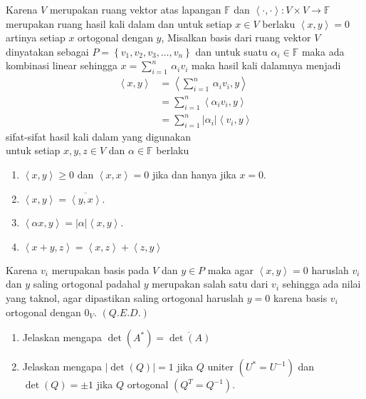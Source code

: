 \documentclass[11pt,a4paper]{article}
\newcommand{\ds}{\displaystyle}
\theoremstyle{plain}
\theoremstyle{definition}
\theoremstyle{remark}
\begin{document}
\begin{enumerate}
\begin{enumerate}
		Karena $V$ merupakan ruang vektor atas lapangan $\mathbb{F}$ dan $\left\langle \cdot,\cdot\right\rangle:V\times V\rightarrow \mathbb{F}$ merupakan ruang hasil kali dalam dan untuk setiap $x\in V$ berlaku $\left\langle x,y\right\rangle=0$ artinya setiap $x$ ortogonal dengan $y$, Misalkan basis dari ruang vektor $V$ dinyatakan sebagai $P=\left\{ v_{1},v_{2},v_{3},\ldots,v_{n} \right\}$ dan untuk suatu $\alpha_{i}\in \mathbb{F}$ maka ada kombinasi linear sehingga $x=\ds \sum_{i=1}^{n}\, \alpha_{i}v_{i}$ maka hasil kali dalamnya menjadi
		\begin{align*}
		\left\langle x,y\right\rangle &= \left\langle \ds \sum_{i=1}^{n}\, \alpha_{i}v_{i},y\right\rangle \\
		&= \ds \sum_{i=1}^{n} \left\langle \alpha_{i}v_{i},y\right\rangle \\
		&= \ds \sum_{i=1}^{n} \left|\alpha_{i}\right| \left\langle v_{i},y\right\rangle
		\end{align*}
		sifat-sifat hasil kali dalam yang digunakan\\
		untuk setiap $x,y,z\in V$ dan $\alpha\in \mathbb{F}$ berlaku
		\begin{enumerate}
			\item[(HKD1)] $\left\langle x,y\right\rangle\geq 0$ dan $\left\langle x,x\right\rangle=0$ jika dan hanya jika $x=0$.
			\item[(HKD2)] $\left\langle x,y\right\rangle=\overline{\left\langle y,x\right\rangle}$.
			\item[(HKD3)] $\left\langle \alpha x,y\right\rangle=\left| \alpha\right|\left\langle x,y\right\rangle$.
			\item[(HKD4)] $\left\langle x+y,z\right\rangle=\left\langle x,z\right\rangle+\left\langle z,y\right\rangle$
		\end{enumerate}
		Karena $v_{i}$ merupakan basis pada $V$ dan $y\in P$ maka agar $\left\langle x,y\right\rangle=0$ haruslah $v_{i}$ dan $y$ saling ortogonal padahal $y$ merupakan salah satu dari $v_{i}$ sehingga ada nilai yang taknol, agar dipastikan saling ortogonal haruslah $y=0$ karena basis $v_{i}$ ortogonal dengan $0_{V}$. $(Q.E.D.)$
		
		

\end{enumerate}
\end{enumerate}
\end{document}
